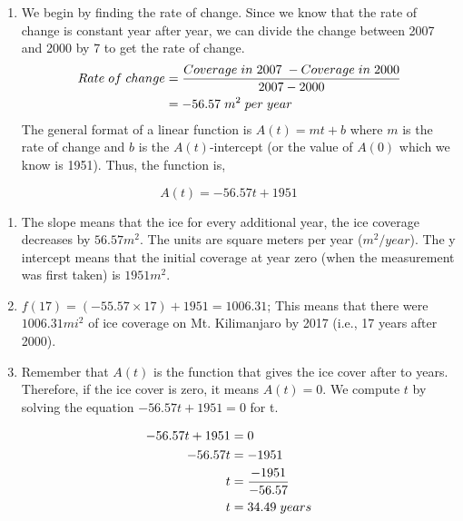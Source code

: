 \documentclass[
  letterpaper,
  DIV=11,
  numbers=noendperiod]{scrreprt}
\providecommand{\tightlist}{%
  \setlength{\itemsep}{0pt}\setlength{\parskip}{0pt}}\usepackage{longtable,booktabs,array}
\begin{document}
\begin{enumerate}
\def\labelenumi{\alph{enumi})}
\tightlist
\item
  We begin by finding the rate of change. Since we know that the rate of
  change is constant year after year, we can divide the change between
  2007 and 2000 by 7 to get the rate of change. \begin{align}
  Rate\hspace{.04in} of\hspace{.04in} change &=  \frac{Coverage \hspace{.04in} in \hspace{.04in} 2007 \hspace{.04in}- Coverage \hspace{.04in} in \hspace{.04in} 2000}{2007-2000}\\
  &= - 56.57\hspace{.04in} m^2\hspace{.04in} per \hspace{.04in} year
  \end{align} The general format of a linear function is \(A(t)=mt+b\)
  where \(m\) is the rate of change and \(b\) is the \(A(t)\)-intercept
  (or the value of \(A(0)\) which we know is 1951). Thus, the function
  is,
\end{enumerate}

\[A(t)=-56.57t + 1951\]

\begin{enumerate}
\def\labelenumi{\alph{enumi})}
\setcounter{enumi}{1}
\item
  The slope means that the ice for every additional year, the ice
  coverage decreases by \(56.57 m^2\). The units are square meters per
  year (\(m^2/year\)). The y intercept means that the initial coverage
  at year zero (when the measurement was first taken) is \(1951 m^2\).
\item
  \(f(17)=(-55.57\times17)+1951=1006.31\); This means that there were
  \(1006.31 mi^2\) of ice coverage on Mt. Kilimanjaro by 2017 (i.e., 17
  years after 2000).
\item
  Remember that \(A(t)\) is the function that gives the ice cover after
  to years. Therefore, if the ice cover is zero, it means \(A(t)=0\). We
  compute \(t\) by solving the equation \(-56.57t + 1951=0\) for t.
\end{enumerate}

\begin{align}
  -56.57t + 1951&=0\\
  -56.57t&=-1951\\
  t&=\frac{-1951}{-56.57}\\
  t&=34.49 \hspace{0.04in} years
  \end{align}
\end{document}
